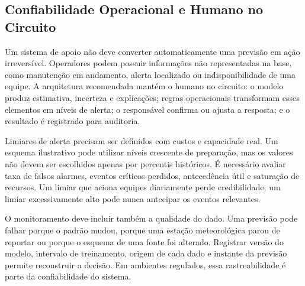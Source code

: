 \subsection{Confiabilidade Operacional e Humano no Circuito}

Um sistema de apoio não deve converter automaticamente uma previsão em ação irreversível. Operadores podem possuir informações não representadas na base, como manutenção em andamento, alerta localizado ou indisponibilidade de uma equipe. A arquitetura recomendada mantém o humano no circuito: o modelo produz estimativa, incerteza e explicações; regras operacionais transformam esses elementos em níveis de alerta; o responsável confirma ou ajusta a resposta; e o resultado é registrado para auditoria.

Limiares de alerta precisam ser definidos com custos e capacidade real. Um esquema ilustrativo pode utilizar níveis crescente de preparação, mas os valores não devem ser escolhidos apenas por percentis históricos. É necessário avaliar taxa de falsos alarmes, eventos críticos perdidos, antecedência útil e saturação de recursos. Um limiar que aciona equipes diariamente perde credibilidade; um limiar excessivamente alto pode nunca antecipar os eventos relevantes.

O monitoramento deve incluir também a qualidade do dado. Uma previsão pode falhar porque o padrão mudou, porque uma estação meteorológica parou de reportar ou porque o esquema de uma fonte foi alterado. Registrar versão do modelo, intervalo de treinamento, origem de cada dado e instante da previsão permite reconstruir a decisão. Em ambientes regulados, essa rastreabilidade é parte da confiabilidade do sistema.

